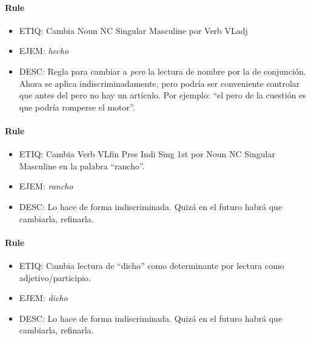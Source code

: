 \documentclass[11pt]{report}
\begin{document}
\paragraph*{Rule}
\begin{itemize}
\item ETIQ: Cambia Noun NC Singular Masculine por Verb VLadj
\item EJEM: \emph{hecho} 
\item DESC: Regla para cambiar a \emph{pero} la lectura de nombre por la de conjunción. Ahora se aplica indiscriminadamente, pero podría ser conveniente controlar que antes del pero no hay un artículo. Por ejemplo: ``el pero de la cuestión es que podría romperse el motor''.
\end{itemize}

\paragraph*{Rule}
\begin{itemize}
\item ETIQ: Cambia Verb VLfin Pres Indi Sing 1st por Noun NC Singular Masculine en la palabra ``rancho''.
\item EJEM: \emph{rancho} 
\item DESC: Lo hace de forma indiscriminada. Quizá en el futuro habrá que cambiarla, refinarla.
\end{itemize}

\paragraph*{Rule}
\begin{itemize}
\item ETIQ: Cambia lectura de ``dicho'' como determinante por lectura como adjetivo/participio.
\item EJEM: \emph{dicho} 
\item DESC: Lo hace de forma indiscriminada. Quizá en el futuro habrá que cambiarla, refinarla.
\end{itemize}
\end{document}
